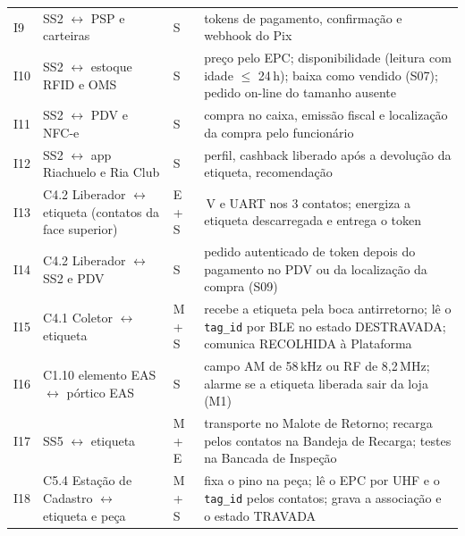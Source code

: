 \begin{longtable}{@{}
    >{\RaggedRight\arraybackslash}p{0.8cm}
    >{\RaggedRight\arraybackslash}p{4.2cm}
    >{\RaggedRight\arraybackslash}p{1.0cm}
    >{\RaggedRight\arraybackslash}p{9.0cm}@{}}
I9 & SS2 $\leftrightarrow$ PSP e carteiras & S & tokens de pagamento, confirmação e webhook do Pix \\
I10 & SS2 $\leftrightarrow$ estoque RFID e OMS & S & preço pelo EPC; disponibilidade (leitura com idade $\leq$ 24\,h); baixa como vendido (S07); pedido on-line do tamanho ausente \\
I11 & SS2 $\leftrightarrow$ PDV e NFC-e & S & compra no caixa, emissão fiscal e localização da compra pelo funcionário \\
I12 & SS2 $\leftrightarrow$ app Riachuelo e Ria Club & S & perfil, cashback liberado após a devolução da etiqueta, recomendação \\
I13 & C4.2 Liberador $\leftrightarrow$ etiqueta (contatos da face superior) & E + S & 5\,V e UART nos 3 contatos; energiza a etiqueta descarregada e entrega o token \\
I14 & C4.2 Liberador $\leftrightarrow$ SS2 e PDV & S & pedido autenticado de token depois do pagamento no PDV ou da localização da compra (S09) \\
I15 & C4.1 Coletor $\leftrightarrow$ etiqueta & M + S & recebe a etiqueta pela boca antirretorno; lê o \texttt{tag\_id} por BLE no estado DESTRAVADA; comunica RECOLHIDA à Plataforma \\
I16 & C1.10 elemento EAS $\leftrightarrow$ pórtico EAS & S & campo AM de 58\,kHz ou RF de 8,2\,MHz; alarme se a etiqueta liberada sair da loja (M1) \\
I17 & SS5 $\leftrightarrow$ etiqueta & M + E & transporte no Malote de Retorno; recarga pelos contatos na Bandeja de Recarga; testes na Bancada de Inspeção \\
I18 & C5.4 Estação de Cadastro $\leftrightarrow$ etiqueta e peça & M + S & fixa o pino na peça; lê o EPC por UHF e o \texttt{tag\_id} pelos contatos; grava a associação e o estado TRAVADA \\
\end{longtable}
\endgroup

